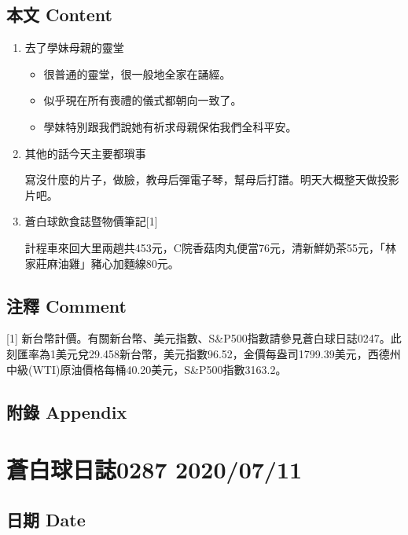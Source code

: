 \documentclass[
]{article}
\providecommand{\tightlist}{%
  \setlength{\itemsep}{0pt}\setlength{\parskip}{0pt}}
\begin{document}
\hypertarget{ux672cux6587-content-9}{%
\subsection{本文 Content}\label{ux672cux6587-content-9}}

\begin{enumerate}
\def\labelenumi{\arabic{enumi}.}
\item
  去了學妹母親的靈堂

  \begin{itemize}
  \tightlist
  \item
    很普通的靈堂，很一般地全家在誦經。
  \item
    似乎現在所有喪禮的儀式都朝向一致了。
  \item
    學妹特別跟我們說她有祈求母親保佑我們全科平安。
  \end{itemize}
\item
  其他的話今天主要都瑣事

  寫沒什麼的片子，做臉，教母后彈電子琴，幫母后打譜。明天大概整天做投影片吧。
\item
  蒼白球飲食誌暨物價筆記{[}1{]}

  計程車來回大里兩趟共453元，C院香菇肉丸便當76元，清新鮮奶茶55元，「林家莊麻油雞」豬心加麵線80元。
\end{enumerate}

\hypertarget{ux6ce8ux91cb-comment-9}{%
\subsection{注釋 Comment}\label{ux6ce8ux91cb-comment-9}}

{[}1{]}
新台幣計價。有關新台幣、美元指數、S\&P500指數請參見蒼白球日誌0247。此刻匯率為1美元兌29.458新台幣，美元指數96.52，金價每盎司1799.39美元，西德州中級(WTI)原油價格每桶40.20美元，S\&P500指數3163.2。

\hypertarget{ux9644ux9304-appendix-9}{%
\subsection{附錄 Appendix}\label{ux9644ux9304-appendix-9}}

\hypertarget{ux84bcux767dux7403ux65e5ux8a8c0287-20200711}{%
\section{蒼白球日誌0287
2020/07/11}\label{ux84bcux767dux7403ux65e5ux8a8c0287-20200711}}

\hypertarget{ux65e5ux671f-date-10}{%
\subsection{日期 Date}\label{ux65e5ux671f-date-10}}
\end{document}
